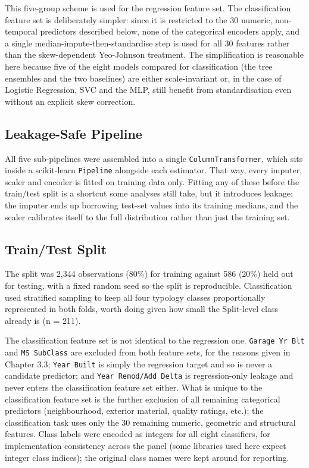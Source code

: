 \documentclass[11pt,a4paper]{article}
\begin{document}
This five-group scheme is used for the regression feature set. The
classification feature set is deliberately simpler: since it is
restricted to the 30 numeric, non-temporal predictors described below,
none of the categorical encoders apply, and a single
median-impute-then-standardise step is used for all 30 features rather
than the skew-dependent Yeo-Johnson treatment. The simplification is
reasonable here because five of the eight models compared for
classification (the tree ensembles and the two baselines) are either
scale-invariant or, in the case of Logistic Regression, SVC and the MLP,
still benefit from standardisation even without an explicit skew
correction.

\subsection{Leakage-Safe Pipeline}\label{leakage-safe-pipeline}

All five sub-pipelines were assembled into a single
\texttt{ColumnTransformer}, which sits inside a scikit-learn
\texttt{Pipeline} \autocite{Pedregosa2011} alongside each estimator.
That way, every imputer, scaler and encoder is fitted on training data
only. Fitting any of these before the train/test split is a shortcut
some analyses still take, but it introduces leakage: the imputer ends up
borrowing test-set values into its training medians, and the scaler
calibrates itself to the full distribution rather than just the training
set.

\subsection{Train/Test Split}\label{traintest-split}

The split was 2,344 observations (80\%) for training against 586 (20\%)
held out for testing, with a fixed random seed so the split is
reproducible. Classification used stratified sampling to keep all four
typology classes proportionally represented in both folds, worth doing
given how small the Split-level class already is (n = 211).

The classification feature set is not identical to the regression one.
\texttt{Garage\ Yr\ Blt} and \texttt{MS\ SubClass} are excluded from
both feature sets, for the reasons given in Chapter 3.3;
\texttt{Year\ Built} is simply the regression target and so is never a
candidate predictor; and \texttt{Year\ Remod/Add\ Delta} is
regression-only leakage and never enters the classification feature set
either. What is unique to the classification feature set is the further
exclusion of all remaining categorical predictors (neighbourhood,
exterior material, quality ratings, etc.); the classification task uses
only the 30 remaining numeric, geometric and structural features. Class
labels were encoded as integers for all eight classifiers, for
implementation consistency across the panel (some libraries used here
expect integer class indices); the original class names were kept around
for reporting.
\end{document}
